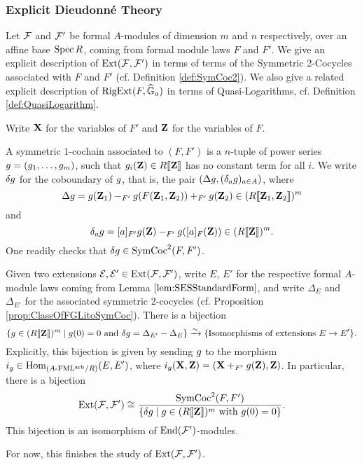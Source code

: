\documentclass[../main.tex]{subfiles}
\begin{document}
\subsubsection{Explicit Dieudonné Theory} %
\label{ssub:Explicit Dieudonne Theory}
Let $\mathcal{F}$ and $\mathcal{F}'$ be formal $A$-modules of dimension $m$ and $n$ respectively,
over an affine base $\operatorname{Spec} R$, coming from formal module laws $F$ and $F'$. We
give an explicit description of $\operatorname{Ext}(\mathcal{F}, \mathcal{F}')$ in terms of terms of the
Symmetric 2-Cocycles associated with $F$ and $F'$ (cf. Definition
\ref{def:SymCoc2}). 
We also give a related explicit description of $\operatorname {RigExt}(F, \widehat{\mathbb{G}}_a)$ in terms of 
Quasi-Logarithms, cf. Definition \ref{def:QuasiLogarithm}. 

Write $\mathbf{X}$ for the variables of $F'$ and $\mathbf{Z}$ for the variables of $F$.
\begin{defi} \label{def:SymCoc1}
  A symmetric $1$-cochain associated to $(F,F')$ is a $n$-tuple of power 
  series ${g} = (g_1, \dots, g_m)$, such that $g_i(\mathbf{Z}) \in R\llbracket \mathbf{Z} \rrbracket$
  has no constant term for all $i$. We write $\delta {g}$ 
  for the coboundary of ${g}$, that is, the pair $(\Delta {g}, (\delta_a
  {g})_{a \in A})$,
  where
  \begin{equation*}
    \Delta {g} = {g}(\mathbf{Z}_1) -_{F'} {g}(F(\mathbf{Z}_1,\mathbf{Z}_2)) +_{F'} {g}(\mathbf{Z}_2)
    \in (R\llbracket \mathbf{Z}_1, \mathbf{Z}_2 \rrbracket)^m
  \end{equation*}
  and 
  \begin{equation*}
    \delta_a {g} = [a]_{F'} {g}(\mathbf{Z}) -_{F'} {g}([a]_F(\mathbf{Z})) \in (R \llbracket \mathbf{Z}
    \rrbracket)^m.
  \end{equation*}
  One readily checks that $\delta {g} \in \operatorname{SymCoc}^2(F, F')$. 
\end{defi}

\begin{prop}\label{prop:ExtInTermsOfSymCoc}
  Given two extensions $\mathcal{E},\mathcal{E}' \in \operatorname{Ext}(\mathcal{F}, \mathcal{F}')$, write 
  $E$, $E'$ for the respective formal $A$-module laws coming from Lemma
  $\ref{lem:SESStandardForm}$, and write
  $\Delta_E$ and $\Delta_{E'}$ for the associated symmetric $2$-cocycles (cf.
  Proposition \ref{prop:ClassOfFGLitoSymCoc}). There is a bijection
  \begin{equation*}
    \{{g} \in (R\llbracket \mathbf{Z} \rrbracket)^m \mid {g}(0) = 0 \text{ and } \delta {g} = \Delta_{E'} - \Delta_E\}
    \xrightarrow{\sim} \{\text{Isomorphisms of extensions } E \to E' \}.
  \end{equation*}
  Explicitly, this bijection is given by sending ${g}$ to the morphism
  $i_{g} \in \operatorname{Hom}_{{({A}\text-\allowbreak\mathrm{FML^{arb}}/{R})}}(E, E')$, where 
  $i_{g} (\mathbf{X}, \mathbf{Z}) = (\mathbf{X} +_{F'} {g}(\mathbf{Z}), \mathbf{Z})$. In particular, there is a bijection
  \begin{equation*}
    \operatorname{Ext}(\mathcal{F}, \mathcal{F}') \cong \frac{\operatorname{SymCoc}^2(F, F')}{\{\delta {g} 
    \mid {g} \in (R\llbracket \mathbf{Z} \rrbracket)^m \text{ with } {g}(0) = 0\}}.
  \end{equation*}
  This bijection is an isomorphism of $\operatorname{End}(\mathcal{F}')$-modules.
\end{prop}
For now, this finishes the study of $\operatorname{Ext}(\mathcal{F}, \mathcal{F}')$. 
\end{document}
